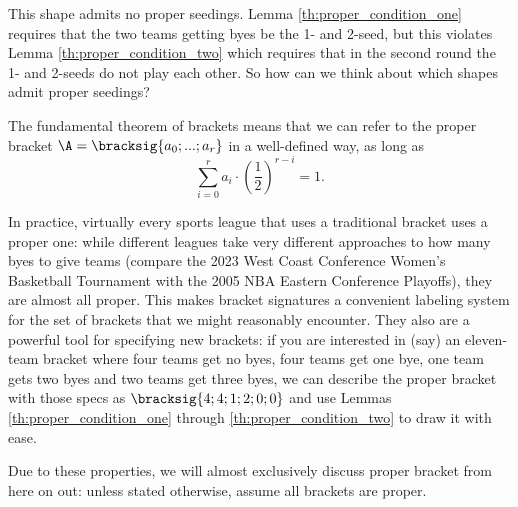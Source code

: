 {    This shape admits no proper seedings. Lemma \ref{th:proper_condition_one} requires that the two teams getting byes be the 1- and 2-seed, but this violates Lemma \ref{th:proper_condition_two} which requires that in the second round the 1- and 2-seeds do not play each other. So how can we think about which shapes admit proper seedings?


    The fundamental theorem of brackets means that we can refer to the proper bracket $\A = \bracksig{a_0; ...; a_r}$ in a well-defined way, as long as $$\sum_{i=0}^r a_i \cdot \left(\frac{1}{2}\right)^{r - i} = 1.$$

    In practice, virtually every sports league that uses a traditional bracket uses a proper one: while different leagues take very different approaches to how many byes to give teams (compare the 2023 West Coast Conference Women's Basketball Tournament with the 2005 NBA Eastern Conference Playoffs), they are almost all proper. This makes bracket signatures a convenient labeling system for the set of brackets that we might reasonably encounter. They also are a powerful tool for specifying new brackets: if you are interested in (say) an eleven-team bracket where four teams get no byes, four teams get one bye, one team gets two byes and two teams get three byes, we can describe the proper bracket with those specs as $\bracksig{4; 4; 1; 2; 0; 0}$ and use Lemmas \ref{th:proper_condition_one} through \ref{th:proper_condition_two} to draw it with ease.


    Due to these properties, we will almost exclusively discuss proper bracket from here on out: unless stated otherwise, assume all brackets are proper.
}